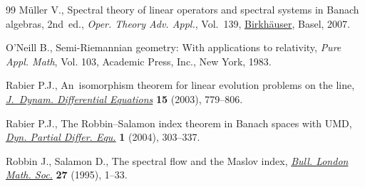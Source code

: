 \documentclass[pdftex]{sigma}
\numberwithin{equation}{section}
\newcommand{\1}{{{\mathchoice {\rm 1\mskip-4mu l} {\rm 1\mskip-4mu l}
{\rm 1\mskip-4.5mu l} {\rm 1\mskip-5mu l}}}}
\begin{document}
\begin{thebibliography}{99}
M\"uller V., Spectral theory of linear operators and spectral systems in
 {B}anach algebras, 2nd~ed., \textit{Oper. Theory Adv. Appl.}, Vol.~139,
 \href{https://doi.org/10.1007/978-3-7643-8265-0}{Birkh\"auser}, Basel, 2007.

O'Neill B., Semi-{R}iemannian geometry: {W}ith applications to relativity,
 \textit{Pure Appl. Math}, Vol. 103, Academic Press, Inc., New York, 1983.

Rabier P.J., An~isomorphism theorem for linear evolution problems on the line,
 \href{https://doi.org/10.1023/B:JODY.0000010065.11894.b6}{\textit{J.~Dynam.
 Differential Equations}} \textbf{15} (2003), 779--806.

Rabier P.J., The {R}obbin--{S}alamon index theorem in {B}anach spaces with
 {UMD}, \href{https://doi.org/10.4310/DPDE.2004.v1.n3.a2}{\textit{Dyn. Partial
 Differ. Equ.}} \textbf{1} (2004), 303--337.

Robbin J., Salamon D., The spectral flow and the {M}aslov index,
 \href{https://doi.org/10.1112/blms/27.1.1}{\textit{Bull. London Math. Soc.}}
 \textbf{27} (1995), 1--33.

\end{thebibliography}\LastPageEnding
\end{document}
